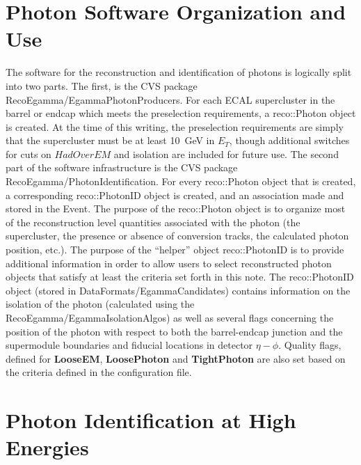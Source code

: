 \documentclass{cmspaper}
\begin{document}
\section{Photon Software Organization and Use}
The software for the reconstruction and identification of photons is logically
split into two parts.  The first, is the CVS package RecoEgamma/EgammaPhotonProducers.  For each ECAL 
supercluster in the barrel or endcap which meets the preselection requirements, a reco::Photon object 
is created.  At the time of this writing, the preselection requirements are simply that the 
supercluster must be at least 10~GeV in $E_T$, though additional switches for cuts on $HadOverEM$ 
and isolation are included for future use.  The second part of the software infrastructure is the
CVS package RecoEgamma/PhotonIdentification.  For every reco::Photon object that is created, a corresponding
reco::PhotonID object is created, and an association made and stored in the Event.
The purpose of the reco::Photon object is to organize most of the reconstruction level quantities associated
with the photon (the supercluster, the presence or absence of conversion tracks, the calculated photon 
position, etc.).  The purpose of the ``helper'' object reco::PhotonID is to provide additional information
in order to allow users to select reconstructed photon objects that satisfy at least the criteria set
forth in this note.  The reco::PhotonID object (stored in DataFormats/EgammaCandidates) contains information
on the isolation of the photon (calculated using the RecoEgamma/EgammaIsolationAlgos) as well as several
flags concerning the position of the photon with respect to both the barrel-endcap junction and the 
supermodule boundaries and fiducial locations in detector $\eta-\phi$.  Quality flags, defined for {\bf LooseEM}, {\bf LoosePhoton} and {\bf TightPhoton} are also set based on the criteria defined in the configuration file.

\section{Photon Identification at High Energies}
\end{document}
